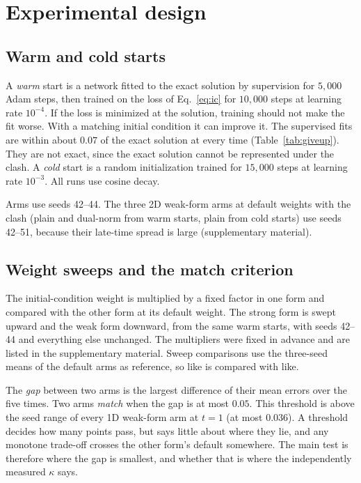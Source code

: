 \documentclass[a4paper,fleqn]{cas-sc}
\begin{document}
\section{Experimental design}
\label{sec:design}

\subsection{Warm and cold starts}
\label{sec:warm}

A \emph{warm} start is a network fitted to the exact solution by supervision for $5{,}000$ Adam steps, then trained on
the loss of Eq.~\eqref{eq:ic} for $10{,}000$ steps at learning rate $10^{-4}$. If the loss is minimized at the solution,
training should not make the fit worse. With a matching initial condition it can improve it. The supervised fits are
within about $0.07$ of the exact solution at every time (Table~\ref{tab:giveup}). They are not exact, since the exact
solution cannot be represented under the clash. A \emph{cold} start is a random initialization trained for $15{,}000$
steps at learning rate $10^{-3}$. All runs use cosine decay.

Arms use seeds 42--44. The three 2D weak-form arms at default weights with the clash (plain and dual-norm from warm
starts, plain from cold starts) use seeds 42--51, because their late-time spread is large
(supplementary material).

\subsection{Weight sweeps and the match criterion}
\label{sec:sweepdesign}

The initial-condition weight is multiplied by a fixed factor in one form and compared with the other form at its default
weight. The strong form is swept upward and the weak form downward, from the same warm starts, with seeds 42--44 and
everything else unchanged. The multipliers were fixed in advance and are listed in the supplementary material. Sweep comparisons use the
three-seed means of the default arms as reference, so like is compared with like.

The \emph{gap} between two arms is the largest difference of their mean errors over the five times. Two arms
\emph{match} when the gap is at most $0.05$. This threshold is above the seed range of every 1D weak-form arm at $t=1$
(at most $0.036$). A threshold decides how many points pass, but says little about where they lie, and any monotone
trade-off crosses the other form's default somewhere. The main test is therefore where the gap is smallest, and whether
that is where the independently measured $\kappa$ says.
\end{document}
